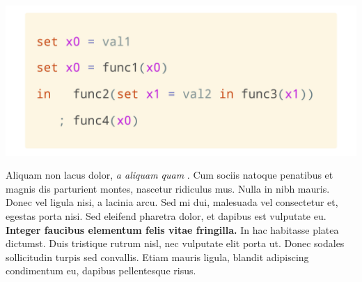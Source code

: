 \documentclass[a1,portrait]{a1poster}
\begin{document}
\begin{multicols}{2}
\begin{multicols}{2}
\begin{minipage}[b]{1\linewidth}
\begin{center}\vspace{1cm}
    \includegraphics[width=0.9\linewidth]{figs/let-realloc.png}
\end{center}\vspace{1cm}
\end{minipage}


\end{multicols}









Aliquam non lacus dolor, \textit{a aliquam quam} \cite{Smith:2012qr}. Cum sociis natoque penatibus et magnis dis parturient montes, nascetur ridiculus mus. Nulla in nibh mauris. Donec vel ligula nisi, a lacinia arcu. Sed mi dui, malesuada vel consectetur et, egestas porta nisi. Sed eleifend pharetra dolor, et dapibus est vulputate eu. \textbf{Integer faucibus elementum felis vitae fringilla.} In hac habitasse platea dictumst. Duis tristique rutrum nisl, nec vulputate elit porta ut. Donec sodales sollicitudin turpis sed convallis. Etiam mauris ligula, blandit adipiscing condimentum eu, dapibus pellentesque risus.


\end{multicols}
\end{document}
